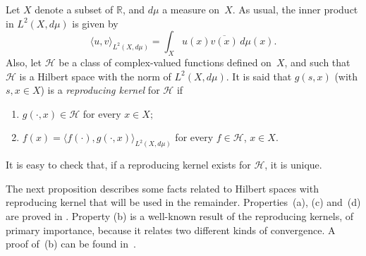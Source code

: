 \documentclass[11pt]{amsart}
\theoremstyle{plain}
\begin{document}
Let $X$ denote a subset of $\mathbb{R}$, and $d\mu$ a measure on~$X$.
As usual, the inner product in $L^2(X,d\mu)$ is given by
\[
  \langle u, v \rangle_{L^2(X,d\mu)}
  = \int_X u(x) \overline{v(x)}\,d\mu(x).
\]
Also, let $\mathcal{H}$ be a class of complex-valued functions defined on~$X$,
and such that $\mathcal{H}$ is a Hilbert space with the norm of $L^{2}(X,d\mu)$.
It is said that $g(s,x)$ (with $s,x \in X$) is a \emph{reproducing kernel} for
$\mathcal{H}$ if
\begin{enumerate}
\item[(i)] $g(\cdot,x) \in \mathcal{H}$ for every $x\in X;$

\item[(ii)] $f(x)  = \langle f(\cdot),g(\cdot,x) \rangle_{L^2(X,d\mu)}$ for every $f\in \mathcal{H}$, $x\in X.$
\end{enumerate}
It is easy to check that, if a reproducing kernel exists for $\mathcal{H}$, it is unique.

The next proposition describes some facts related to Hilbert spaces with reproducing
kernel that will be used in the remainder. Properties~(a), 
(c) and~(d) are proved in \cite{Higgins}. Property (b) is a well-known result of the reproducing kernels, of primary
importance, because it relates two different kinds of convergence. A proof
of~(b) can be found in~\cite{Mate}.
\end{document}
